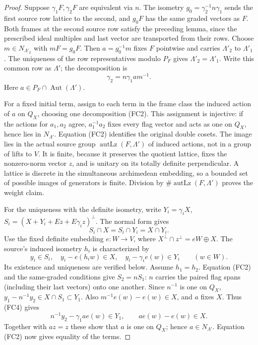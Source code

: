 \begin{proof}
Suppose \(\gamma_1 F,\gamma_2 F\) are equivalent via \(n\).
The isometry \(g_0=\gamma_2^{-1}n\gamma_1\) sends the first
source row lattice to the second, and \(g_0F\) has the
same graded vectors as \(F\).  Both frames at the second
source row satisfy the preceding lemma, since the prescribed
ideal multiples and last vector are transported from their rows.
Choose \(m\in N_{\Lambda'_2}\) with \(mF=g_0F\).
Then \(a=g_0^{-1}m\) fixes \(F\) pointwise and carries
\(\Lambda'_2\) to \(\Lambda'_1\).  The uniqueness of the row
representatives modulo \(P_F\) gives \(\Lambda'_2=\Lambda'_1\).
Write this common row as \(\Lambda'\); the decomposition is
\[
                  \gamma_2=n\gamma_1 a m^{-1}.       \tag{FC2}
\]
Here \(a\in P_F\cap\operatorname{Aut}(\Lambda')\).

For a fixed initial term, assign to each term in the frame class
the induced action of \(a\) on \(Q_X\), choosing one decomposition
(FC2).  This assignment is injective: if the actions for \(a_1,a_2\)
agree, \(a_1^{-1}a_2\) fixes every flag vector and acts as one on
\(Q_X\), hence lies in \(N_{\Lambda'}\).
Equation (FC2) identifies the original double cosets.
The image lies in the actual source group \(\operatorname{autLz}(F,\Lambda')\)
of induced actions, not in a group of lifts to \(V\).
It is finite, because it preserves the quotient lattice, fixes
the nonzero-norm vector \(z\), and is unitary on its totally
definite perpendicular.  A lattice is discrete in the
simultaneous archimedean embedding, so a bounded set of
possible images of generators is finite.  Division by
\(\#\operatorname{autLz}(F,\Lambda')\) proves the weight claim.

For the uniqueness with the definite isometry, write
\(Y_i=\gamma_i X\), \(S_i=(X+Y_i+Ez+E\gamma_i z)^\perp\).
The normal form gives
\[
                 S_i\cap X=S_i\cap Y_i=X\cap Y_i.       \tag{FC3}
\]
Use the fixed definite embedding \(e:W\to V\), where
\(X^\perp\cap z^\perp=eW\oplus X\).
The source's induced isometry \(h_i\) is characterized by
\[
 y_i\in S_i,\quad y_i-e(h_iw)\in X,\quad
 y_i-\gamma_i e(w)\in Y_i\qquad(w\in W).
 \tag{FC4}
\]
Its existence and uniqueness are verified below.
Assume \(h_1=h_2\).  Equation (FC2) and the same-graded
conditions give \(S_2=nS_1\): \(n\) carries the paired flag
spans (including their last vectors) onto one another.
Since \(n^{-1}\) is one on \(Q_X\),
\(y_1-n^{-1}y_2\in X\cap S_1\subset Y_1\).
Also \(m^{-1}e(w)-e(w)\in X\), and \(a\) fixes \(X\).
Thus (FC4) gives
\[
 n^{-1}y_2-\gamma_1 a e(w)\in Y_1,\qquad
                a e(w)-e(w)\in X.
\]
Together with \(az=z\) these show that \(a\) is one on
\(Q_X\); hence \(a\in N_{\Lambda'}\).
Equation (FC2) now gives equality of the terms.
\end{proof}

